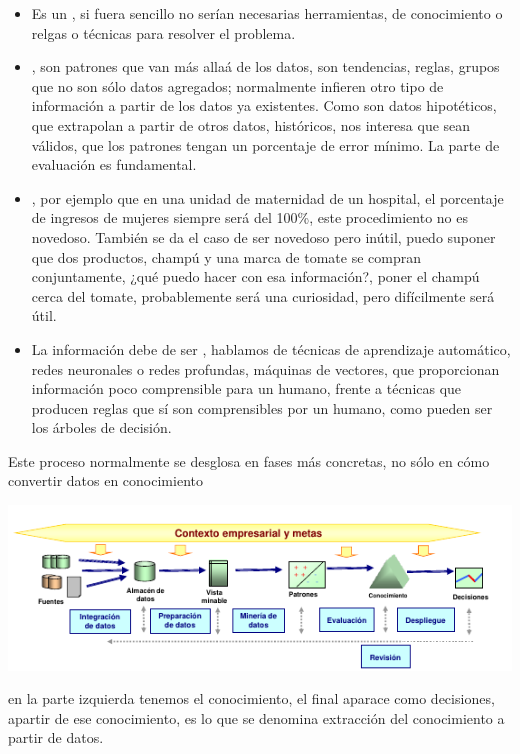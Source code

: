 \begin{itemize}
    \item Es un , si fuera sencillo no serían necesarias herramientas, de conocimiento o relgas o técnicas para resolver el problema.
    \item {}, son patrones que van más allaá de los datos, son tendencias, reglas, grupos que no son sólo datos agregados; normalmente infieren otro tipo de información a partir de los datos ya existentes. Como son datos hipotéticos, que extrapolan a partir de otros datos, históricos, nos interesa que sean válidos, que los patrones tengan un porcentaje de error mínimo. La parte de evaluación es fundamental.
    \item {}, por ejemplo que en una unidad de maternidad de un hospital, el porcentaje de ingresos de mujeres siempre será del 100\%, este procedimiento no es novedoso. También se da el caso de ser novedoso pero inútil, puedo suponer que dos productos, champú y una marca de tomate se compran conjuntamente, ¿qué puedo hacer con esa información?, poner el champú cerca del tomate, probablemente será una curiosidad, pero difícilmente será útil.
    \item La información debe de ser , hablamos de técnicas de aprendizaje automático, redes neuronales o redes profundas, máquinas de vectores, que proporcionan información poco comprensible para un humano, frente a técnicas que producen reglas que sí son comprensibles por un humano, como pueden ser los árboles de decisión.
\end{itemize}

Este proceso normalmente se desglosa en fases más concretas, no sólo en cómo convertir datos en conocimiento

\begin{center}
    \includegraphics[scale=.9]{images/mod01-16.png}
\end{center}
en la parte izquierda tenemos el conocimiento, el final aparace como decisiones, apartir de ese conocimiento, es lo que se denomina extracción del conocimiento a partir de datos.

